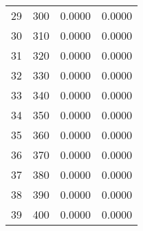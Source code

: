 \begin{table}[H]
\begin{tabular}{cccc}
\cline{1-4}
29 & 300 & 0.0000 & 0.0000 \\
\cline{1-4}
30 & 310 & 0.0000 & 0.0000 \\
\cline{1-4}
31 & 320 & 0.0000 & 0.0000 \\
\cline{1-4}
32 & 330 & 0.0000 & 0.0000 \\
\cline{1-4}
33 & 340 & 0.0000 & 0.0000 \\
\cline{1-4}
34 & 350 & 0.0000 & 0.0000 \\
\cline{1-4}
35 & 360 & 0.0000 & 0.0000 \\
\cline{1-4}
36 & 370 & 0.0000 & 0.0000 \\
\cline{1-4}
37 & 380 & 0.0000 & 0.0000 \\
\cline{1-4}
38 & 390 & 0.0000 & 0.0000 \\
\cline{1-4}
39 & 400 & 0.0000 & 0.0000 \\
\cline{1-4}
\end{tabular}
\end{table}

